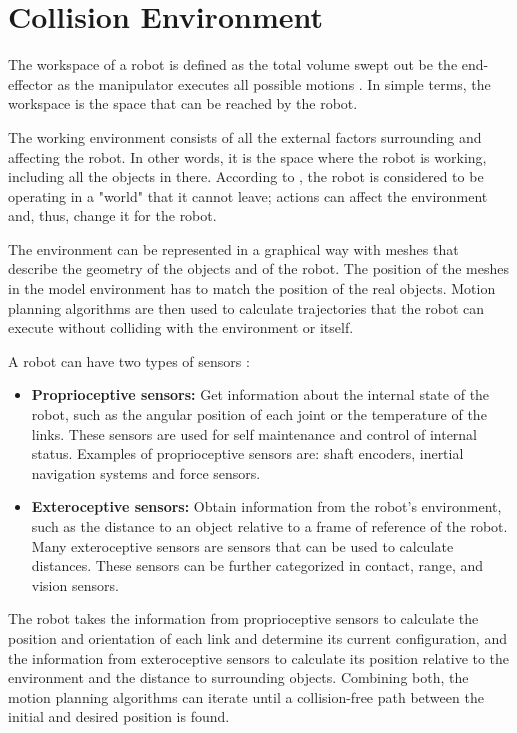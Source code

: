 \section{Collision Environment}

The workspace of a robot is defined as the total volume swept out be the end-effector as the manipulator executes all possible motions \citep[chap. 1]{Handbook}. In simple terms, the workspace is the space that can be reached by the robot.

The working environment consists of all the external factors surrounding and affecting the robot. In other words, it is the space where the robot is working, including all the objects in there. According to \citet{Taskspace}, the robot is considered to be operating in a "world" that it cannot leave; actions can affect the environment and, thus, change it for the robot. 

The environment can be represented in a graphical way with meshes that describe the geometry of the objects and of the robot. The position of the meshes in the model environment has to match the position of the real objects. Motion planning algorithms are then used to calculate trajectories that the robot can execute without colliding with the environment or itself. 

A robot can have two types of sensors \citep[chap. 1]{Russel}:
\begin{itemize}
	\item \textbf{Proprioceptive sensors:} Get information about the internal state of the robot, such as the angular position of each joint or the temperature of the links. These sensors are used for self maintenance and control of internal status. Examples of proprioceptive sensors are: shaft encoders, inertial navigation systems and force sensors.
	\item \textbf{Exteroceptive sensors:} Obtain information from the robot's environment, such as the distance to an object relative to a frame of reference of the robot. Many exteroceptive sensors are sensors that can be used to calculate distances. These sensors can be further categorized in contact, range, and vision sensors.
\end{itemize}

The robot takes the information from proprioceptive sensors to calculate the position and orientation of each link and determine its current configuration, and the information from exteroceptive sensors to calculate its position relative to the environment and the distance to surrounding objects. Combining both, the motion planning algorithms can iterate until a collision-free path between the initial and desired position is found.

